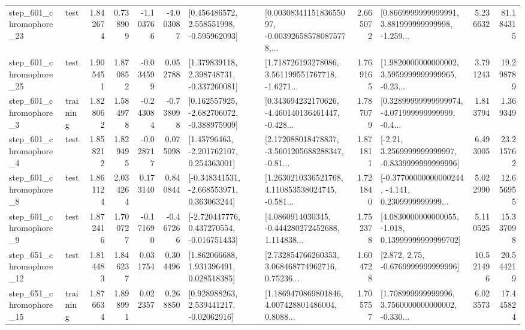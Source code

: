 \begin{tabular}{llrrrrllrlrr}
  step\_601\_chromophore\_23 &      test &      1.842674 &    0.738909 &     -1.103766 & -4.003087 &    [0.456486572, 2.558551998, -0.595962093] &  [0.0030834115183655097, -0.003926585780875778,... &       2.665072 &  [0.8669999999999991, 3.881999999999998, -1.259... &            5.236632 &         81.184315 \\
  step\_601\_chromophore\_25 &      test &      1.905451 &    1.870852 &     -0.034599 &  0.052788 &    [1.379839118, 2.398748731, -0.337260081] &  [1.718726193278086, 3.561199551767718, -1.6271... &       1.769165 &  [1.9820000000000002, 3.5959999999999965, -0.23... &            3.791243 &         19.298789 \\
   step\_601\_chromophore\_3 &  training &      1.828062 &    1.584978 &     -0.243084 & -0.738098 &   [0.162557925, -2.682706072, -0.388975909] &  [0.343694232170626, -4.460140136461447, -0.428... &       1.787079 &  [0.32899999999999974, -4.071999999999999, -0.4... &            1.813794 &          1.369349 \\
   step\_601\_chromophore\_4 &      test &      1.858212 &    1.829495 &     -0.028717 &  0.075098 &     [1.45796463, -2.201762107, 0.254363001] &  [2.172088018478837, -3.5601205688288347, -0.81... &       1.871811 &   [-2.21, 3.2569999999999997, -0.8339999999999996] &            6.493005 &         23.215762 \\
   step\_601\_chromophore\_8 &      test &      1.861124 &    2.034264 &      0.173140 &  0.840844 &   [-0.348341531, -2.668553971, 0.363063244] &  [1.2630210336521768, 4.110853538024745, -0.581... &       1.721840 &  [-0.37700000000000244, -4.141, 0.2309999999999... &            5.022990 &         12.656955 \\
   step\_601\_chromophore\_9 &      test &      1.872416 &    1.700727 &     -0.171690 & -0.467266 &   [-2.720447776, 0.437270554, -0.016751433] &  [4.0860914030345, -0.444280272452688, 1.114838... &       1.752378 &  [4.0830000000000055, -1.018, 0.13999999999999702] &            5.110525 &         15.337098 \\
  step\_651\_chromophore\_12 &      test &      1.814483 &    1.846237 &      0.031754 &  0.304496 &     [1.862066688, 1.931396491, 0.028518385] &  [2.732854766260353, 3.068468774962716, 0.75236... &       1.604728 &                 [2.872, 2.75, -0.6769999999999996] &           10.521496 &         20.544219 \\
  step\_651\_chromophore\_15 &  training &      1.876634 &    1.898991 &      0.022357 &  0.268850 &     [0.928988263, 2.539441217, -0.02062916] &  [1.1869470869801846, 4.007428801486004, 0.8088... &       1.705757 &  [1.708999999999996, 3.7560000000000002, -0.330... &            6.023573 &         17.445824 \\

\end{tabular}
